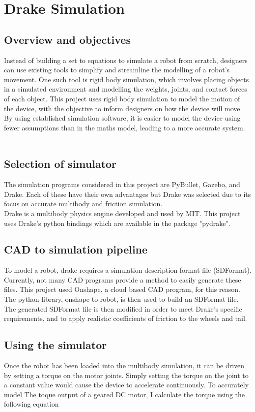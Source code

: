 \chapter{Drake Simulation}

\section{Overview and objectives}

Instead of building a set to equations to simulate a robot from scratch, designers can use existing tools to simplify and streamline the modelling of a robot's movement. One such tool is rigid body simulation, which involves placing objects in a simulated environment and modelling the weights, joints, and contact forces of each object. This project uses rigid body simulation to model the motion of the device, with the objective to inform designers on how the device will move. By using established simulation software, it is easier to model the device using fewer assumptions than in the maths model, leading to a more accurate system.\\
\\
\section{Selection of simulator}
The simulation programs considered in this project are PyBullet, Gazebo, and Drake. Each of these have their own advantages but Drake was selected due to its focus on accurate multibody and friction simulation.
\\
Drake is a multibody physics engine developed and used by MIT. This project uses Drake's python bindings which are available in the package "pydrake".\\
\section{CAD to simulation pipeline}
To model a robot, drake requires a simulation description format file (SDFormat). Currently, not many CAD programs provide a method to easily generate these files. This project used Onshape, a cloud based CAD program, for this reason. The python library, onshape-to-robot, is then used to build an SDFormat file. The generated SDFormat file is then modified in order to meet Drake's specific requirements, and to apply realistic coefficients of friction to the wheels and tail.\\

\section{Using the simulator}
Once the robot has been loaded into the multibody simulation, it can be driven by setting a torque on the motor joints. Simply setting the torque on the joint to a constant value would cause the device to accelerate continuously. To accurately model The toque output of a geared DC motor, I calculate the torque using the following equation\\

